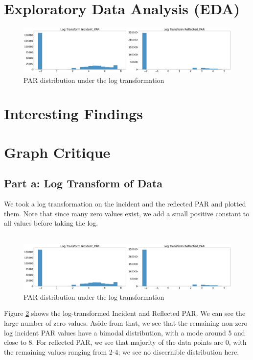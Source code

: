 \documentclass[11pt, letterpaper]{article}
\begin{document}
\section{Exploratory Data Analysis (EDA)}
\begin{figure}[h!]
\centering
\includegraphics[width=1.0\textwidth]{Fig5_graph_critique_a.png}
\caption{PAR distribution under the log transformation}
\label{fig:graph_crtique_a}
\end{figure}

\section{Interesting Findings}
\section{Graph Critique}
\subsection{Part a: Log Transform of Data}
We took a log transformation on the incident and the reflected PAR and plotted them. Note that since many zero values exist, we add a small positive constant to all values before taking the log.
\\ \\
\begin{figure}[h!]
\centering
\includegraphics[width=1.0\textwidth]{Fig5_graph_critique_a.png}
\caption{PAR distribution under the log transformation}
\label{fig:graph_crtique_a}
\end{figure}
Figure \ref{fig:graph_crtique_a} shows the log-transformed Incident and Reflected PAR. We can see the large number of zero values. Aside from that, we see that the remaining non-zero log incident PAR values have a bimodal distribution, with a mode around 5 and close to 8. For reflected PAR, we see that majority of the data points are 0, with the remaining values ranging from 2-4; we see no discernible distribution here.
\end{document}

